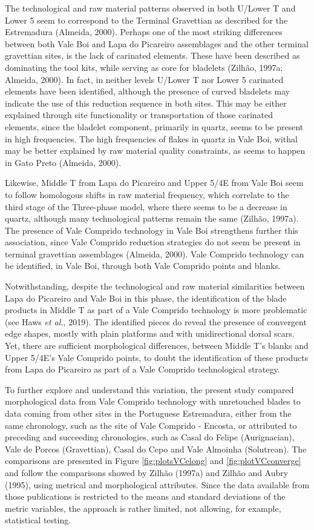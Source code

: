 \documentclass[12pt,twoside]{reedthesis}
\begin{document}
The technological and raw material patterns observed in both U/Lower T and Lower 5 seem to correspond to the Terminal Gravettian as described for the Estremadura (Almeida, 2000). Perhaps one of the most striking differences between both Vale Boi and Lapa do Picareiro assemblages and the other terminal gravettian sites, is the lack of carinated elements. These have been described as dominating the tool kits, while serving as core for bladelets (Zilhão, 1997a; Almeida, 2000). In fact, in neither levels U/Lower T nor Lower 5 carinated elements have been identified, although the presence of curved bladelets may indicate the use of this reduction sequence in both sites. This may be either explained through site functionality or transportation of those carinated elements, since the bladelet component, primarily in quartz, seems to be present in high frequencies. The high frequencies of flakes in quartz in Vale Boi, withal may be better explained by raw material quality constraints, as seems to happen in Gato Preto (Almeida, 2000).

Likewise, Middle T from Lapa do Picareiro and Upper 5/4E from Vale Boi seem to follow homologous shifts in raw material frequency, which correlate to the third stage of the Three-phase model, where there seems to be a decrease in quartz, although many technological patterns remain the same (Zilhão, 1997a). The presence of Vale Comprido technology in Vale Boi strengthens further this association, since Vale Comprido reduction strategies do not seem be present in terminal gravettian assemblages (Almeida, 2000). Vale Comprido technology can be identified, in Vale Boi, through both Vale Comprido points and blanks.

Notwithstanding, despite the technological and raw material similarities between Lapa do Picareiro and Vale Boi in this phase, the identification of the blade products in Middle T as part of a Vale Comprido technology is more problematic (see Haws \emph{et al.}, 2019). The identified pieces do reveal the presence of convergent edge shapes, mostly with plain platforms and with unidirectional dorsal scars. Yet, there are sufficient morphological differences, between Middle T's blanks and Upper 5/4E's Vale Comprido points, to doubt the identification of these products from Lapa do Picareiro as part of a Vale Comprido technological strategy.

To further explore and understand this variation, the present study compared morphological data from Vale Comprido technology with unretouched blades to data coming from other sites in the Portuguese Estremadura, either from the same chronology, such as the site of Vale Comprido - Encosta, or attributed to preceding and succeeding chronologies, such as Casal do Felipe (Aurignacian), Vale de Porcos (Gravettian), Casal do Cepo and Vale Almoinha (Solutrean). The comparisons are presented in Figure \ref{fig:plotsVCelong} and \ref{fig:plotVCconverge} and follow the comparisons showed by Zilhão (1997a) and Zilhão and Aubry (1995), using metrical and morphological attributes. Since the data available from those publications is restricted to the means and standard deviations of the metric variables, the approach is rather limited, not allowing, for example, statistical testing.
\end{document}
